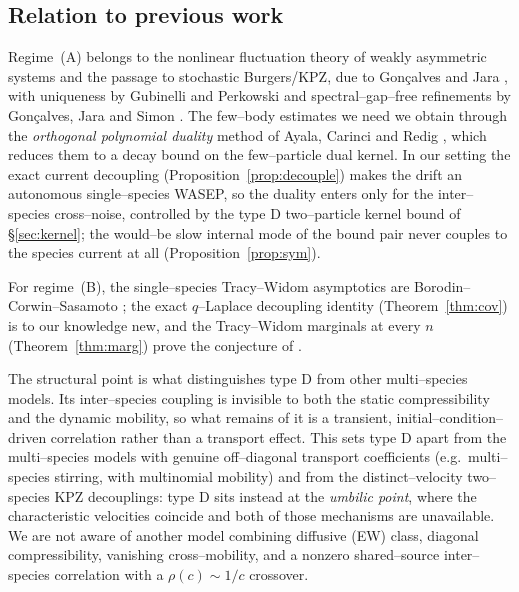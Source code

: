 \documentclass[11pt]{article}
\theoremstyle{plain}
\theoremstyle{definition}
\theoremstyle{remark}
\begin{document}
\subsection{Relation to previous work}\label{sec:introlit}
Regime~(A) belongs to the nonlinear fluctuation theory of weakly asymmetric systems and
the passage to stochastic Burgers/KPZ, due to Gon\c{c}alves and Jara \cite{GJ}, with
uniqueness by Gubinelli and Perkowski \cite{GP} and spectral--gap--free refinements by
Gon\c{c}alves, Jara and Simon \cite{GJS}. The few--body estimates we need we obtain
through the \emph{orthogonal polynomial duality} method of Ayala, Carinci and Redig
\cite{ACR,ACR2}, which reduces them to a decay bound on the few--particle dual kernel. In
our setting the exact current decoupling (Proposition~\ref{prop:decouple}) makes the
drift an autonomous single--species WASEP, so the duality enters only for the
inter--species cross--noise, controlled by the type D two--particle kernel bound of
\S\ref{sec:kernel}; the would--be slow internal mode of the bound pair never couples to
the species current at all (Proposition~\ref{prop:sym}).

For regime~(B), the single--species Tracy--Widom asymptotics are
Borodin--Corwin--Sasamoto \cite{BCS}; the exact $q$--Laplace decoupling identity
(Theorem~\ref{thm:cov}) is to our knowledge new, and the Tracy--Widom marginals at
every $n$ (Theorem~\ref{thm:marg}) prove the conjecture of \cite[\S3.1.1]{REU}.

The structural point is what distinguishes type D from other multi--species models. Its
inter--species coupling is invisible to both the static compressibility and the dynamic
mobility, so what remains of it is a transient, initial--condition--driven correlation
rather than a transport effect. This sets type D apart from the multi--species models
with genuine off--diagonal transport coefficients (e.g.\ multi--species stirring, with
multinomial mobility) and from the distinct--velocity two--species KPZ decouplings:
type D sits instead at the \emph{umbilic point}, where the characteristic velocities
coincide and both of those mechanisms are unavailable. We are not aware of another
model combining diffusive (EW) class, diagonal compressibility, vanishing
cross--mobility, and a nonzero shared--source inter--species correlation with a
$\rho(c)\sim1/c$ crossover.
\end{document}
